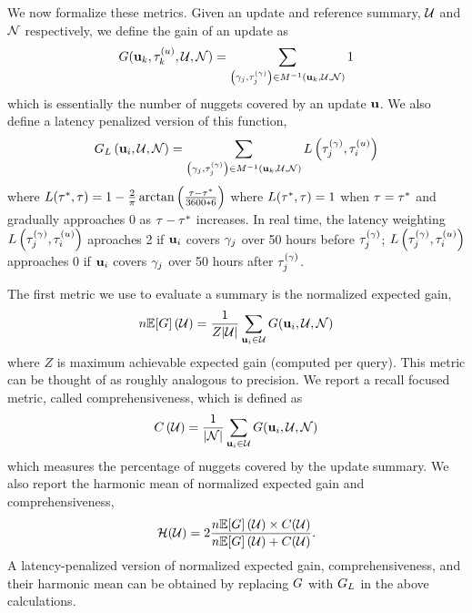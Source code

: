 We now formalize these metrics.  Given an update and reference summary,
$\mathcal{U}$ and $\mathcal{N}$ respectively, we define the gain of an
update as \[  G(\mathbf{u}_k,\tau^{(u)}_k, \mathcal{U}, \mathcal{N}) =  \sum_{
 \left(\gamma_j, \tau^{(\gamma)}_j\right) \in  M^{-1}(\mathbf{u}_k,  \mathcal{U}, \mathcal{N})} 1 \] which is
essentially the number of nuggets covered by an update $\mathbf{u}$.  We also
define a latency penalized version of this function, \[
G_L\left(\mathbf{u}_i, \mathcal{U},\mathcal{N} \right) =
\sum_{
 \left(\gamma_j, \tau^{(\gamma)}_j\right) \in  M^{-1}(\mathbf{u}_k,  \mathcal{U}, \mathcal{N})} L\left(\tau^{(\gamma)}_j, \tau^{(u)}_i\right)  \]
where $L(\tau^*, \tau) = 1 - \frac{2}{\pi}\arctan\left(
\frac{\tau - \tau^*}{3600 * 6} \right) $ where
$L(\tau^*,\tau) = 1$ when $\tau=\tau^*$ and
gradually approaches 0 as $\tau - \tau^*$ increases. In real time,
the latency weighting
$L\left(\tau^{(\gamma)}_j,\tau^{(u)}_i\right)$ aproaches 2 if
$\mathbf{u}_i$ covers $\gamma_j$ over 50 hours before $\tau^{(\gamma)}_j$;
$L\left(\tau^{(\gamma)}_j,\tau^{(u)}_i\right)$ approaches 0 if
$\mathbf{u}_i$ covers $\gamma_j$ over 50 hours after $\tau^{(\gamma)}_j$.
 

The first metric we use to evaluate a summary is the normalized expected gain,
\[
n\mathbb{E}[G]\left(\mathcal{U}\right) = \frac{1}{Z{\left\vert \mathcal{U} \right\vert}} 
\sum_{\mathbf{u}_i \in \mathcal{U}} 
    G(\mathbf{u}_i, \mathcal{U}, \mathcal{N})\]
where $Z$ is maximum achievable expected gain (computed per query). 
This metric can be thought of as roughly analogous to precision.
We report a recall focused metric, called comprehensiveness, which
is defined as 
\[
C\left(\mathcal{U}\right) = \frac{1}{{\left\vert \mathcal{N} \right\vert}} 
\sum_{\mathbf{u}_i \in \mathcal{U}} 
    G(\mathbf{u}_i, \mathcal{U}, \mathcal{N})\]
%
which measures the percentage of
nuggets covered by the update summary. We also report the harmonic mean of normalized expected
gain and  comprehensiveness,
 \[ \mathcal{H}(\mathcal{U}) = 
2 \frac{n\mathbb{E}[G]\left(\mathcal{U}\right) \times C(\mathcal{U})}
{  n\mathbb{E}[G]\left(\mathcal{U}\right) + C(\mathcal{U})   }.
\]
A latency-penalized version of
normalized expected gain, comprehensiveness, and their harmonic mean 
can be obtained by replacing
$G$ with $G_L$ in the above calculations.











